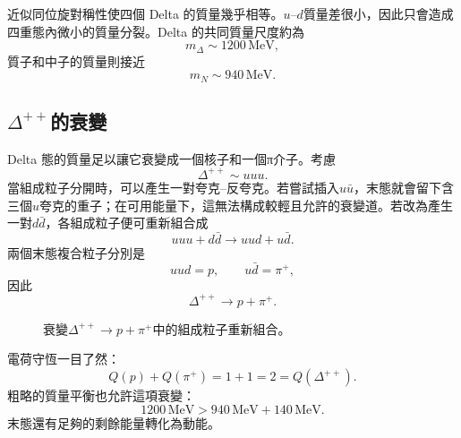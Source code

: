 近似同位旋對稱性使四個 Delta 的質量幾乎相等。\(u\)--\(d\)質量差很小，因此只會造成四重態內微小的質量分裂。Delta 的共同質量尺度約為
\begin{equation}
m_\Delta\sim1200\,\mathrm{MeV},
\end{equation}
質子和中子的質量則接近
\begin{equation}
m_N\sim940\,\mathrm{MeV}.
\end{equation}

\subsection{\texorpdfstring{\(\Delta^{++}\)}{Delta++}的衰變}

Delta 態的質量足以讓它衰變成一個核子和一個{\proseunicodefont π}介子。考慮
\begin{equation}
\Delta^{++}\sim uuu.
\end{equation}
當組成粒子分開時，可以產生一對夸克--反夸克。若嘗試插入\(u\bar u\)，末態就會留下含三個\(u\)夸克的重子；在可用能量下，這無法構成較輕且允許的衰變道。若改為產生一對\(d\bar d\)，各組成粒子便可重新組合成
\begin{equation}
uuu+d\bar d
\longrightarrow
uud+u\bar d.
\end{equation}
兩個末態複合粒子分別是
\begin{equation}
uud=p,
\qquad
u\bar d=\pi^+,
\end{equation}
因此
\begin{equation}
\Delta^{++}\longrightarrow p+\pi^+.
\end{equation}

\begin{figure}[h]
\centering
{}
\caption{衰變\(\Delta^{++}\rightarrow p+\pi^+\)中的組成粒子重新組合。}
\end{figure}

電荷守恆一目了然：
\begin{equation}
Q(p)+Q(\pi^+)=1+1=2=Q(\Delta^{++}).
\end{equation}
粗略的質量平衡也允許這項衰變：
\begin{equation}
1200\,\mathrm{MeV}
>
940\,\mathrm{MeV}+140\,\mathrm{MeV}.
\end{equation}
末態還有足夠的剩餘能量轉化為動能。

